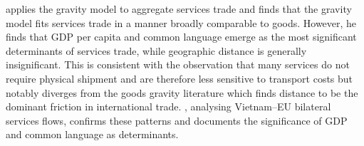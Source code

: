 \citet{walsh2006} applies the gravity model to aggregate services trade and finds that the gravity model fits services trade in a manner broadly comparable to goods. However, he finds that GDP per capita and common language emerge as the most significant determinants of services trade, while geographic distance is generally insignificant. This is consistent with the observation that many services do not require physical shipment and are therefore less sensitive to transport costs but notably diverges from the goods gravity literature which finds distance to be the dominant friction in international trade. \citet{thai2006}, analysing Vietnam--EU bilateral services flows, confirms these patterns and documents the significance of GDP and common language as determinants.
